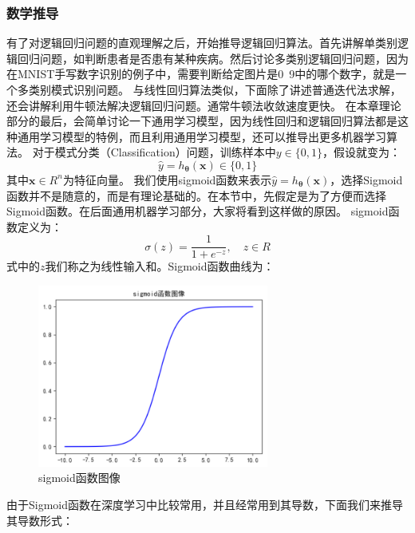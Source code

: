 \documentclass[UTF8]{article}
\begin{document}
\subsubsection{数学推导}
有了对逻辑回归问题的直观理解之后，开始推导逻辑回归算法。首先讲解单类别逻辑回归问题，如判断患者是否患有某种疾病。然后讨论多类别逻辑回归问题，因为在MNIST手写数字识别的例子中，需要判断给定图片是0~9中的哪个数字，就是一个多类别模式识别问题。\newline
与线性回归算法类似，下面除了讲述普通迭代法求解，还会讲解利用牛顿法解决逻辑回归问题。通常牛顿法收敛速度更快。\newline
在本章理论部分的最后，会简单讨论一下通用学习模型，因为线性回归和逻辑回归算法都是这种通用学习模型的特例，而且利用通用学习模型，还可以推导出更多机器学习算法。\newline
对于模式分类（Classification）问题，训练样本中$y \in \{0,1\}$，假设就变为：
\begin{equation}
\hat{y} = h_{\boldsymbol{\theta}}(\boldsymbol{x}) \in \{0, 1\}
\label{lcrn-hx-def}
\end{equation}
其中$\boldsymbol{x} \in R^{n}$为特征向量。\newline
我们使用sigmoid函数来表示$\hat{y}=h_{\boldsymbol{\theta}}(\boldsymbol{x})$，选择Sigmoid函数并不是随意的，而是有理论基础的。在本节中，先假定是为了方便而选择Sigmoid函数。在后面通用机器学习部分，大家将看到这样做的原因。\newline
sigmoid函数定义为：
\begin{equation}
\sigma (z) = \frac{1}{1 + e^{-z}}, \quad z \in R
\label{lcrn-sigmoid-function-def}
\end{equation}
式中的$z$我们称之为线性输入和。Sigmoid函数曲线为：
\begin{figure}[H]
	\caption{sigmoid函数图像}
	\label{f000023}
	\centering
	\includegraphics[height=6cm]{images/f000023}
\end{figure}
由于Sigmoid函数在深度学习中比较常用，并且经常用到其导数，下面我们来推导其导数形式：
\end{document}
